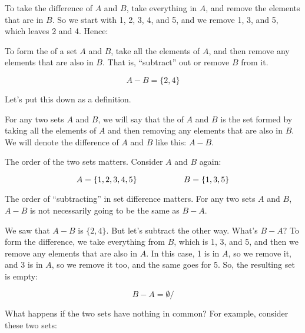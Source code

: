 \documentclass[../../../main.tex]{subfiles}
\begin{document}
To take the difference of $A$ and $B$, take everything in $A$, and remove the elements that are in $B$. So we start with 1, 2, 3, 4, and 5, and we remove 1, 3, and 5, which leaves 2 and 4. Hence:

\begin{terminology}
  To form the  of a set $A$ and $B$, take all the elements of $A$, and then remove any elements that are also in $B$. That is, ``subtract'' out or remove $B$ from it.
\end{terminology}

\begin{equation*}
  A - B = \{ 2, 4 \}
\end{equation*} 

Let's put this down as a definition.

\begin{fdefinition}[Difference]
  For any two sets $A$ and $B$, we will say that the  of $A$ and $B$ is the set formed by taking all the elements of $A$ and then removing any elements that are also in $B$. We will denote the difference of $A$ and $B$ like this: $A - B$.
\end{fdefinition}

The order of the two sets matters. Consider $A$ and $B$ again:

\begin{equation*}
  A = \{ 1, 2, 3, 4, 5 \} \hskip 2cm B = \{ 1, 3, 5 \}
\end{equation*}

\begin{aside}
  \begin{remark}
    The order of ``subtracting'' in set difference matters. For any two sets $A$ and $B$, $A - B$ is not necessarily going to be the same as $B - A$.
  \end{remark}
\end{aside}

We saw that $A - B$ is $\{ 2, 4 \}$. But let's subtract the other way. What's $B - A$? To form the difference, we take everything from $B$, which is 1, 3, and 5, and then we remove any elements that are also in $A$. In this case, 1 is in $A$, so we remove it, and 3 is in $A$, so we remove it too, and the same goes for 5. So, the resulting set is empty:

\begin{equation*}
  B - A = \emptyset/
\end{equation*}

What happens if the two sets have nothing in common? For example, consider these two sets:
\end{document}
